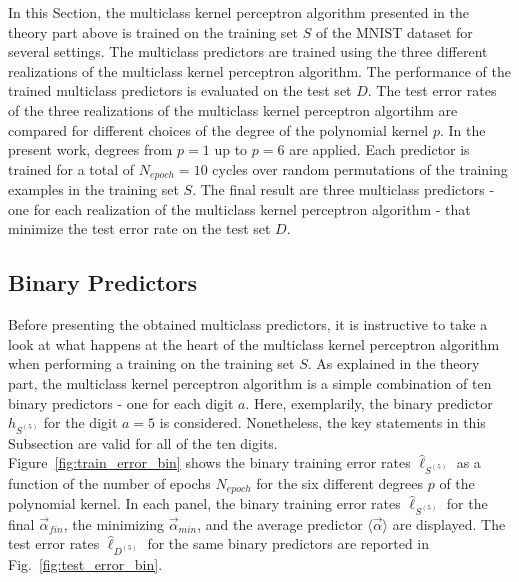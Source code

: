 In this Section, the multiclass kernel perceptron algorithm presented in the theory part above is trained on the training set $S$ of the MNIST dataset for several settings. The multiclass predictors are trained using the three different realizations of the multiclass kernel perceptron algorithm. The performance of the trained multiclass predictors is evaluated on the test set $D$. The test error rates of the three realizations of the multiclass kernel perceptron algortihm are compared for different choices of the degree of the polynomial kernel $p$. In the present work, degrees from $p=1$ up to $p=6$ are applied. Each predictor is trained for a total of $N_{epoch}=10$ cycles over random permutations of the training examples in the training set $S$. The final result are three multiclass predictors - one for each realization of the multiclass kernel perceptron algorithm - that minimize the test error rate on the test set $D$.

\subsection{Binary Predictors}\label{subsec:bin_pred}
Before presenting the obtained multiclass predictors, it is instructive to take a look at what happens at the heart of the multiclass kernel perceptron algorithm when performing a training on the training set $S$. As explained in the theory part, the multiclass kernel perceptron algorithm is a simple combination of ten binary predictors - one for each digit $a$. Here, exemplarily, the binary predictor $h_{S^{(5)}}$ for the digit $a=5$ is considered. Nonetheless, the key statements in this Subsection are valid for all of the ten digits. \\

Figure~\ref{fig:train_error_bin} shows the binary training error rates $\hat{\ell}_{S^{(5)}}$ as a function of the number of epochs $N_{epoch}$ for the six different degrees $p$ of the polynomial kernel. In each panel, the binary training error rates $\hat{\ell}_{S^{(5)}}$ for the final $\vec{\alpha}_{fin}$, the minimizing $\vec{\alpha}_{min}$, and the average predictor $\langle\vec{\alpha}\rangle$ are displayed. The test error rates $\hat{\ell}_{D^{(5)}}$ for the same binary predictors are reported in Fig.~\ref{fig:test_error_bin}. \\

